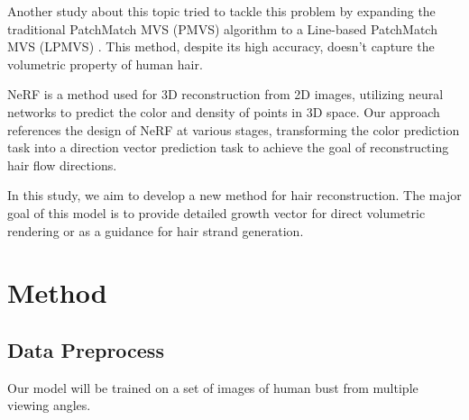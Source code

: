\documentclass[12pt]{article}
\begin{document}
  Another study about this topic tried to tackle this problem by expanding the traditional PatchMatch MVS (PMVS) algorithm to a Line-based PatchMatch MVS (LPMVS) \cite{nam_strand-accurate_nodate}. This method, despite its high accuracy, doesn't capture the volumetric property of human hair.

  NeRF \cite{mildenhall_nerf_2020} is a method used for 3D reconstruction from 2D images, utilizing neural networks to predict the color and density of points in 3D space. Our approach references the design of NeRF at various stages, transforming the color prediction task into a direction vector prediction task to achieve the goal of reconstructing hair flow directions.

  In this study, we aim to develop a new method for hair reconstruction. The major goal of this model is to provide detailed growth vector for direct volumetric rendering or as a guidance for hair strand generation.

  \section{Method}
    \subsection{Data Preprocess}
    
    Our model will be trained on a set of images of human bust from multiple viewing angles.
\end{document}
